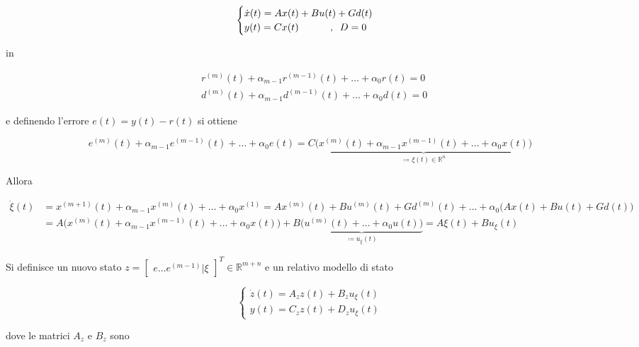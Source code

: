 	\begin{equation}
		\begin{cases}
			\dot{x}(t)=Ax(t)+Bu(t)+Gd(t) \\
			y(t)=Cx(t) \trippleSpacing \trippleSpacing, \singleSpacing D=0
		\end{cases}
		\label{eq:sistema}
	\end{equation}
	  
	\noindent in 
	
	\begin{align*}
		& r^{(m)}(t)+\alpha_{m-1}r^{(m-1)}(t)+\dots+\alpha_0r(t)=0 \\
		& d^{(m)}(t)+\alpha_{m-1}d^{(m-1)}(t)+\dots+\alpha_0d(t)=0 
	\end{align*}
	
	\noindent e definendo l'errore $e(t)=y(t)-r(t)$ si ottiene
	
	\begin{equation}
		e^{(m)}(t)+\alpha_{m-1}e^{(m-1)}(t)+\dots+\alpha_0e(t)=C\underbrace{\Big(x^{(m)}(t)+\alpha_{m-1}x^{(m-1)}(t)+\dots+\alpha_0x(t)\Big)}_\text{$\coloneqq\xi(t) \in \mathbb{R}^n $}
	\end{equation}
	
	\noindent Allora 
	
	\begin{align*}
		\dot{\xi}(t) &= x^{(m+1)}(t)+\alpha_{m-1}x^{(m)}(t)+\dots+\alpha_0x^{(1)}=   Ax^{(m)}(t)+Bu^{(m)}(t)+Gd^{(m)}(t)+\dots+\alpha_0\Big(Ax(t)+Bu(t)+Gd(t)\Big) \\
		&=A\Big(x^{(m)}(t)+\alpha_{m-1}x^{(m-1)}(t)+\dots+\alpha_0x(t)\Big)+B\underbrace{\Big(u^{(m)}(t)+\dots+\alpha_0u(t)\Big)}_\text{$\coloneqq u_{\xi}(t)$}=A\xi(t)+Bu_{\xi}(t)
	\end{align*}
	
	\noindent Si definisce un nuovo stato $z=\begin{bmatrix}e \dots e^{(m-1)} | \xi\end{bmatrix}^T \in \mathbb{R}^{m+n}$ e un relativo modello di stato
	
	\begin{equation}
		\begin{cases}
			\dot{z}(t)=A_zz(t)+B_zu_{\xi}(t) \\
			y(t)=C_zz(t)+D_zu_{\xi}(t)
		\end{cases}
	\end{equation}
	
	\noindent dove le matrici $A_z$ e $B_z$ sono
	

